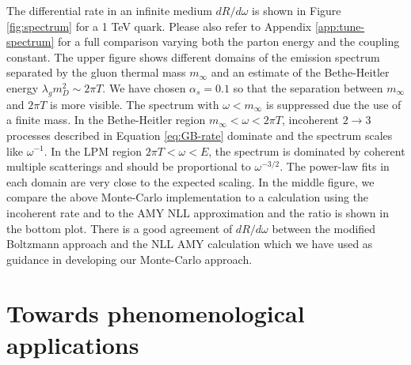 \documentclass[aps, prc, reprint, amsmath, groupedaddress, nofootinbib]{revtex4-1}
\begin{document}
The differential rate in an infinite medium $dR/d\omega$ is shown in Figure \ref{fig:spectrum} for a 1 TeV quark.
Please also refer to Appendix \ref{app:tune-spectrum} for a full comparison varying both the parton energy and the coupling constant.
The upper figure shows different domains of the emission spectrum separated by the gluon thermal mass $m_\infty$ and an estimate of the Bethe-Heitler energy $\lambda_g m_D^2 \sim 2\pi T$.
We have chosen $\alpha_s = 0.1$ so that the separation between $m_\infty$ and $2\pi T$ is more visible.
The spectrum with $\omega < m_\infty$ is suppressed due the use of a finite mass.
In the Bethe-Heitler region $m_\infty < \omega < 2\pi T$, incoherent $2\rightarrow 3$ processes described in Equation \ref{eq:GB-rate} dominate and the spectrum scales like $\omega^{-1}$.
In the LPM region $2\pi T < \omega < E$, the spectrum is dominated by coherent multiple scatterings and should be proportional to $\omega^{-3/2}$.
The power-law fits in each domain are very close to the expected scaling.
In the middle figure, we compare the above Monte-Carlo implementation to a calculation using the incoherent rate and to the AMY NLL approximation and the ratio is shown in the bottom plot.
There is a good agreement of $dR/d\omega$ between the modified Boltzmann approach and the NLL AMY calculation which we have used as guidance in developing our Monte-Carlo approach.


\section{Towards phenomenological applications}
\end{document}
